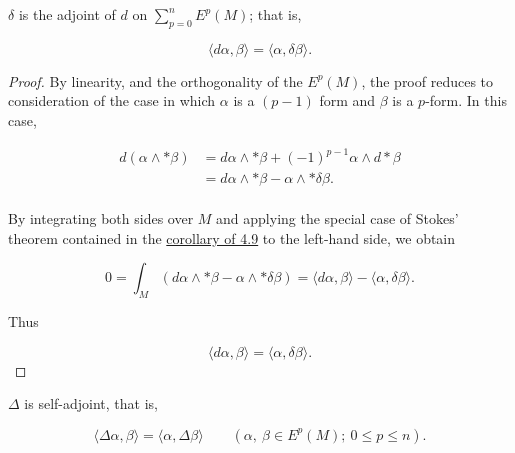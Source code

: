 \begin{proposition}\label{thm:6.2}
$\delta$ is the adjoint of $d$ on $\sum_{p=0}^{n} E^{p}(M)$; that is,


\begin{equation}
\tag{1}\label{eq:6.2:1}
\langle d\alpha,\beta\rangle=\langle\alpha,\delta\beta\rangle.
\end{equation}

\end{proposition}

\begin{proof}
By linearity, and the orthogonality of the $E^{p}(M)$, the proof reduces to consideration of the case in which $\alpha$ is a $(p-1)$ form and $\beta$ is a $p$-form. In this case,

\begin{equation}
\tag{2}\label{eq:6.2:2}
\begin{aligned}{d(\alpha\wedge{*}\beta)}&{{}=d\alpha\wedge{*}\beta+(-1)^{p-1}\alpha\wedge d\ast\beta}\\ {}&{{}=d\alpha\wedge{*}\beta-\alpha\wedge{*}\delta\beta.}\\ \end{aligned}
\end{equation}

By integrating both sides over $M$ and applying the special case of Stokes' theorem contained in the \hyperref[thm:4.9]{corollary of 4.9} to the left-hand side, we obtain


\begin{equation}
\tag{3}\label{eq:6.2:3}
0=\int_{M}(d\alpha\wedge*\beta-\alpha\wedge*\delta\beta)=\langle d\alpha,\beta\rangle-\langle\alpha,\delta\beta\rangle.
\end{equation}

Thus


\begin{equation}
\tag{4}\label{eq:6.2:4}
\langle d\alpha,\beta\rangle=\langle\alpha,\delta\beta\rangle.
\end{equation}

\end{proof}

\begin{corollary*}
$\Delta$ is self-adjoint, that is,

\begin{equation}
\langle\Delta\alpha,\beta\rangle=\langle\alpha,\Delta\beta\rangle\qquad(\alpha,\:\beta\in E^{p}(M);\:0\leq p\leq n).
\end{equation}

\end{corollary*}

